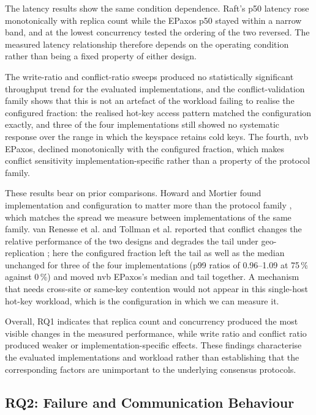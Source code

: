 The latency results show the same condition dependence. Raft's p50 latency
rose monotonically with replica count while the EPaxos p50 stayed within a
narrow band, and at the lowest concurrency tested the ordering of the two
reversed. The measured latency relationship therefore depends on the
operating condition rather than being a fixed property of either design.

The write-ratio and conflict-ratio sweeps produced no statistically
significant throughput trend for the evaluated implementations, and the
conflict-validation family shows that this is not an artefact of the
workload failing to realise the configured fraction: the realised hot-key
access pattern matched the configuration exactly, and three of the four
implementations still showed no systematic response over the range in which
the keyspace retains cold keys. The fourth, nvb EPaxos, declined
monotonically with the configured fraction, which makes conflict sensitivity
implementation-specific rather than a property of the protocol family.

These results bear on prior comparisons. Howard and Mortier found
implementation and configuration to matter more than the protocol family
\cite{howard2020raft}, which matches the spread we measure between
implementations of the same family. van Renesse et al. and Tollman et al.
reported that conflict changes the relative performance of the two designs
and degrades the tail under geo-replication \cite{vanrenesse2015paxos,
tollman2021epaxos}; here the configured fraction left the tail as well as the
median unchanged for three of the four implementations (p99 ratios of
0.96--1.09 at 75\,\% against 0\,\%) and moved nvb EPaxos's median and tail
together. A mechanism that needs cross-site or same-key contention would not
appear in this single-host hot-key workload, which is the configuration in
which we can measure it.

Overall, RQ1 indicates that replica count and concurrency produced the most
visible changes in the measured performance, while write ratio and conflict
ratio produced weaker or implementation-specific effects. These findings
characterise the evaluated implementations and workload rather than
establishing that the corresponding factors are unimportant to the
underlying consensus protocols.

\subsection{RQ2: Failure and Communication Behaviour}

